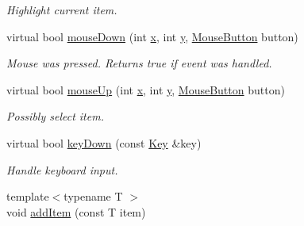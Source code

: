 \begin{DoxyCompactItemize}
\begin{DoxyCompactList}\small\item\em Highlight current item. \end{DoxyCompactList}\item 
\hypertarget{classGUI_1_1Menu_a8a8b70584666a921cdb7f8b73bc281c4}{virtual bool \hyperlink{classGUI_1_1Menu_a8a8b70584666a921cdb7f8b73bc281c4}{mouse\-Down} (int \hyperlink{classGUI_1_1Window_a6ca6a80ca00c9e1d8ceea8d3d99a657d}{x}, int \hyperlink{classGUI_1_1Window_a0ee8e923aff2c3661fc2e17656d37adf}{y}, \hyperlink{namespaceGUI_ad06082a7b02aa73697f39eb8e0856de9}{Mouse\-Button} button)}\label{classGUI_1_1Menu_a8a8b70584666a921cdb7f8b73bc281c4}

\begin{DoxyCompactList}\small\item\em Mouse was pressed. Returns true if event was handled. \end{DoxyCompactList}\item 
\hypertarget{classGUI_1_1Menu_a4bb3124249e2092d1f8ec90ae698a66f}{virtual bool \hyperlink{classGUI_1_1Menu_a4bb3124249e2092d1f8ec90ae698a66f}{mouse\-Up} (int \hyperlink{classGUI_1_1Window_a6ca6a80ca00c9e1d8ceea8d3d99a657d}{x}, int \hyperlink{classGUI_1_1Window_a0ee8e923aff2c3661fc2e17656d37adf}{y}, \hyperlink{namespaceGUI_ad06082a7b02aa73697f39eb8e0856de9}{Mouse\-Button} button)}\label{classGUI_1_1Menu_a4bb3124249e2092d1f8ec90ae698a66f}

\begin{DoxyCompactList}\small\item\em Possibly select item. \end{DoxyCompactList}\item 
\hypertarget{classGUI_1_1Menu_aa9e05f820c1edeb1c884e75bd71b2b6b}{virtual bool \hyperlink{classGUI_1_1Menu_aa9e05f820c1edeb1c884e75bd71b2b6b}{key\-Down} (const \hyperlink{classGUI_1_1Key}{Key} \&key)}\label{classGUI_1_1Menu_aa9e05f820c1edeb1c884e75bd71b2b6b}

\begin{DoxyCompactList}\small\item\em Handle keyboard input. \end{DoxyCompactList}\item 
\hypertarget{classGUI_1_1Menu_af1f513668dcbc8e912c65e2fd7e03b24}{{\footnotesize template$<$typename T $>$ }\\void \hyperlink{classGUI_1_1Menu_af1f513668dcbc8e912c65e2fd7e03b24}{add\-Item} (const T item)}\label{classGUI_1_1Menu_af1f513668dcbc8e912c65e2fd7e03b24}


\end{DoxyCompactItemize}
